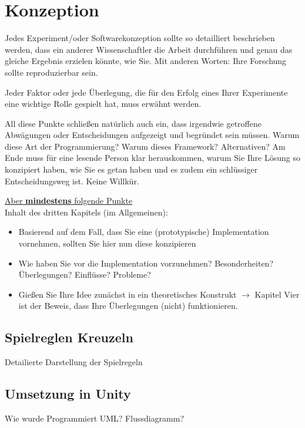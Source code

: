 

\clearpage
\chapter{Konzeption}

Jedes Experiment/oder Softwarekonzeption sollte so detailliert beschrieben werden, dass ein anderer Wissenschaftler die Arbeit durchführen und genau das gleiche Ergebnis erzielen könnte, wie Sie. 
Mit anderen Worten: Ihre Forschung sollte reproduzierbar sein.

Jeder Faktor oder jede Überlegung, die für den Erfolg eines Ihrer Experimente eine wichtige Rolle gespielt hat, muss erwähnt werden.

All diese Punkte schließen natürlich auch ein, dass irgendwie getroffene Abwägungen oder Entscheidungen aufgezeigt und begründet sein müssen. Warum diese Art der Programmierung? Warum dieses Framework?
Alternativen? Am Ende muss für eine lesende Person klar herauskommen, warum Sie Ihre Lösung so konzipiert haben, wie Sie es getan haben und es zudem ein schlüssiger Entscheidungsweg ist. Keine Willkür.

\underline{Aber \textbf{mindestens} folgende Punkte}\\
Inhalt des dritten Kapitels (im Allgemeinen):
\begin{itemize}
    \item Basierend auf dem Fall, dass Sie eine (prototypische) Implementation vornehmen, sollten Sie hier nun diese konzipieren
    \item Wie haben Sie vor die Implementation vorzunehmen? Besonderheiten? Überlegungen? Einflüsse? Probleme?
    \item Gießen Sie Ihre Idee zunächst in ein theoretisches Konstrukt $\rightarrow$ Kapitel Vier ist der Beweis, dass Ihre Überlegungen (nicht) funktionieren.
\end{itemize}

\section{Spielreglen Kreuzeln}
Detailierte Darstellung der Spielregeln

\section{Umsetzung in Unity}
Wie wurde Programmiert
UML?
Flussdiagramm?

